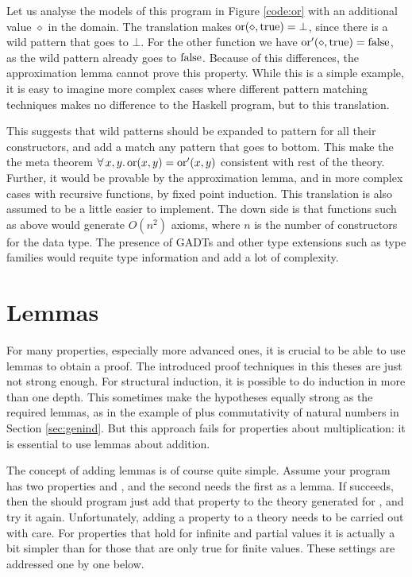 Let us analyse the models of this program in Figure \ref{code:or} with
an additional value $\diamond$ in the domain. The translation makes
$\mathrm{or}(\diamond,\mathrm{true}) = \bot$, since there is a wild pattern that
goes to $\bot$. For the other function we have
$\mathrm{or'}(\diamond,\mathrm{true}) = \mathrm{false}$, as the wild pattern already
goes to $\mathrm{false}$. Because of this differences, the approximation
lemma cannot prove this property. While this is a simple example, it
is easy to imagine more complex cases where different pattern matching
techniques makes no difference to the Haskell program, but to this
translation.

This suggests that wild patterns should be expanded to pattern for all
their constructors, and add a match any pattern that goes to
bottom. This make the the meta theorem
$\forall \, x , y . \, \mathrm{or}(x,y) = \mathrm{or'}(x,y)$ consistent with rest of the
theory.  Further, it would be provable by the approximation lemma, and
in more complex cases with recursive functions, by fixed point
induction. This translation is also assumed to be a little easier to
implement. The down side is that functions such as  above
would generate $O(n^2)$ axioms, where $n$ is the number of constructors for
the data type. The presence of GADTs and other type extensions such as
type families would requite type information and add a lot of complexity.

\section{Lemmas}

For many properties, especially more advanced ones, it is crucial to
be able to use lemmas to obtain a proof. The introduced proof
techniques in this theses are just not strong enough. For structural
induction, it is possible to do induction in more than one depth. This
sometimes make the hypotheses equally strong as the required lemmas,
as in the example of plus commutativity of natural numbers in Section
\ref{sec:genind}. But this approach fails for properties about
multiplication: it is essential to use lemmas about addition.

The concept of adding lemmas is of course quite simple. Assume your
program has two properties  and , and the
second needs the first as a lemma. If  succeeds, then the
should program just add that property to the theory generated for
, and try it again. Unfortunately, adding a property to a
theory needs to be carried out with care. For properties that hold for
infinite and partial values it is actually a bit simpler than for
those that are only true for finite values. These settings are
addressed one by one below.

